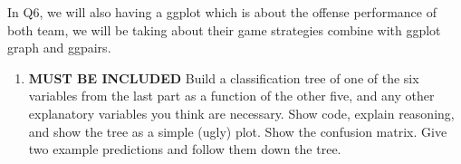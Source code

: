 \documentclass[
  a3paper,
]{article}
\newenvironment{Shaded}{\begin{snugshade}}{\end{snugshade}}
\newcommand{\AttributeTok}[1]{\textcolor[rgb]{0.13,0.29,0.53}{#1}}
\newcommand{\CommentTok}[1]{\textcolor[rgb]{0.56,0.35,0.01}{\textit{#1}}}
\newcommand{\FloatTok}[1]{\textcolor[rgb]{0.00,0.00,0.81}{#1}}
\newcommand{\FunctionTok}[1]{\textcolor[rgb]{0.13,0.29,0.53}{\textbf{#1}}}
\newcommand{\NormalTok}[1]{#1}
\newcommand{\OtherTok}[1]{\textcolor[rgb]{0.56,0.35,0.01}{#1}}
\newcommand{\SpecialCharTok}[1]{\textcolor[rgb]{0.81,0.36,0.00}{\textbf{#1}}}
\newcommand{\StringTok}[1]{\textcolor[rgb]{0.31,0.60,0.02}{#1}}
\providecommand{\tightlist}{%
  \setlength{\itemsep}{0pt}\setlength{\parskip}{0pt}}
\begin{document}
In Q6, we will also having a ggplot which is about the offense
performance of both team, we will be taking about their game strategies
combine with ggplot graph and ggpairs.

\newpage

\vspace{2cm}

\begin{enumerate}
\def\labelenumi{\arabic{enumi})}
\setcounter{enumi}{2}
\tightlist
\item
  \textbf{MUST BE INCLUDED} Build a classification tree of one of the
  six variables from the last part as a function of the other five, and
  any other explanatory variables you think are necessary. Show code,
  explain reasoning, and show the tree as a simple (ugly) plot. Show the
  confusion matrix. Give two example predictions and follow them down
  the tree.
\end{enumerate}

\begin{Shaded}
\end{Shaded}
\end{document}

